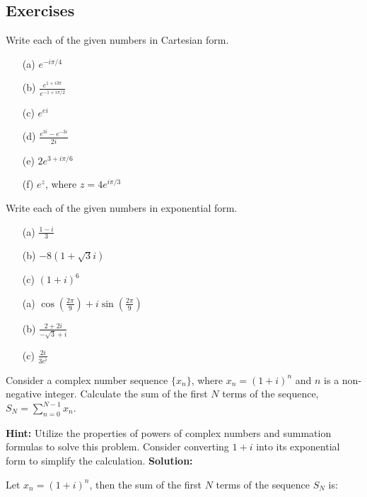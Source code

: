 \documentclass[
	12pt, %
	fleqn, %
	a4paper, %
]{LegrandOrangeBook}
\begin{document}
\subsection{Exercises}
\begin{exercise}
    Write each of the given numbers in Cartesian form.
\begin{enumerate}
    \item[(a)] \( e^{-i\pi/4} \)
    \item[(b)] \( \frac{e^{1+i3\pi}}{e^{-1+i\pi/2}} \)
    \item[(c)] \( e^{ei} \)

    \item[(d)] \( \frac{e^{3i} - e^{-3i}}{2i} \)
    \item[(e)] \( 2e^{3+i\pi/6} \)
    \item[(f)] \( e^{z} \), where \( z = 4e^{i\pi/3} \)
\end{enumerate}
\end{exercise}
\begin{exercise}
    Write each of the given numbers in exponential form.
    \begin{enumerate}
        \item[(a)] \( \frac{1 - i}{3} \)
        \item[(b)] \( -8\left(1 + \sqrt{3}i\right) \)
        \item[(c)] \( (1 + i)^6 \)
        \item[(a)] \( \cos\left(\frac{2\pi}{9}\right) + i \sin\left(\frac{2\pi}{9}\right) \)
        \item[(b)] \( \frac{2 + 2i}{-\sqrt{3} + i} \)
        \item[(c)] \( \frac{2i}{3e^{i}} \)
    \end{enumerate}
\end{exercise}

\begin{exercise}
    Consider a complex number sequence \(\{x_n\}\), where \(x_n = (1 + i)^n\) and \(n\) is a non-negative integer. Calculate the sum of the first \(N\) terms of the sequence, \(S_N = \sum_{n=0}^{N-1} x_n\).

\end{exercise}
\textbf{Hint:}
Utilize the properties of powers of complex numbers and summation formulas to solve this problem. Consider converting \(1 + i\) into its exponential form to simplify the calculation.
\textbf{Solution:}

    Let \( x_n = (1 + i)^n \), then the sum of the first \( N \) terms of the sequence \( S_N \) is:
\end{document}
